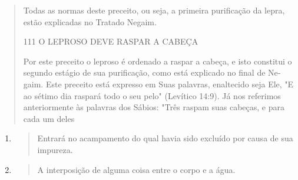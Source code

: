 \begin{quote}
Todas as normas deste preceito, ou seja, a primeira purificação da
lepra, estão explicadas no Tratado Negaim.

111 O LEPROSO DEVE RASPAR A CABEÇA

Por este preceito o leproso é ordenado a raspar a cabeça, e isto
cons­titui o segundo estágio de sua purificação, como está explicado no
final de Ne­gaim. Este preceito está expresso em Suas palavras,
enaltecido seja Ele, "E ao sétimo dia raspará todo o seu pelo" (Levítico
14:9). Já nos referimos anterior­mente às palavras dos Sábios: "Três
raspam suas cabeças, e para cada um deles
\end{quote}

\begin{enumerate}
\def\labelenumi{\arabic{enumi}.}
\setcounter{enumi}{150}
\item
  \begin{quote}
  Entrará no acampamento do qual havia sido excluído por causa de sua
  impureza.
  \end{quote}
\item
  \begin{quote}
  A interposição de alguma coisa entre o corpo e a água.
  \end{quote}
\end{enumerate}


